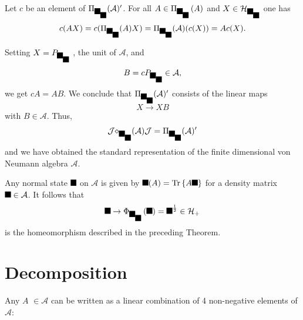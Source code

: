 \documentclass[aps,preprint]{revtex4}%
\providecommand{\U}[1]{\protect\rule{.1in}{.1in}}
\begin{document}
Let $c$ be an element of $\Pi_{\U{3c9} _{\U{3c1} }}(\mathcal{A})^{\prime}$.
For all $A\in\Pi_{\U{3c9} _{\U{3c1} }}\left(  A\right)  $ and $X\in
\mathcal{H}_{\U{3c9} _{\U{3c1} }}$ one has
\begin{equation}
c(AX)=c(\Pi_{\U{3c9} _{\U{3c1} }}(A)X)=\Pi_{\U{3c9} _{\U{3c1} }}%
(\mathcal{A})(c(X))=Ac(X).
\end{equation}


Setting $X=P_{\U{3c9} _{\U{3c1} }}$ , the unit of $\mathcal{A}$, and
\begin{equation}
B=cP_{\U{3c9} _{\U{3c1} }}\in\mathcal{A},
\end{equation}
we get $cA=AB$. We conclude that $\Pi_{\U{3c9} _{\U{3c1} }}(\mathcal{A}%
)^{\prime}$ consists of the linear maps%
\begin{equation}
X\rightarrow XB
\end{equation}
with $B\in\mathcal{A}$. Thus,
\begin{equation}
\mathcal{J\Pi_{\U{3c9} _{\U{3c1} }}(\mathcal{A})J}=\Pi_{\U{3c9} _{\U{3c1} }%
}(\mathcal{A})^{\prime}%
\end{equation}
and we have obtained the standard representation of the finite dimensional von
Neumann algebra $\mathcal{A}$.

Any normal state $\U{3bd} $ on $\mathcal{A}$ is given by $\U{3bd}
(A)=\operatorname{Tr}\left\{  A\U{3c1} \right\}  $ for a density matrix
$\U{3c1} \in\mathcal{A}$. It follows that%
\begin{equation}
\U{3bd} \rightarrow\Phi_{\U{3c9} _{\U{3c1} }}\left(  \U{3bd} \right)  =\U{3c1}
^{\frac{1}{2}}\in\mathcal{H}_{+}%
\end{equation}
is the homeomorphism described in the preceding Theorem.

\section{Decomposition}

Any $A$ $\in\mathcal{A}$ can be written as a linear combination of 4
non-negative elements of $\mathcal{A}$:
\end{document}
